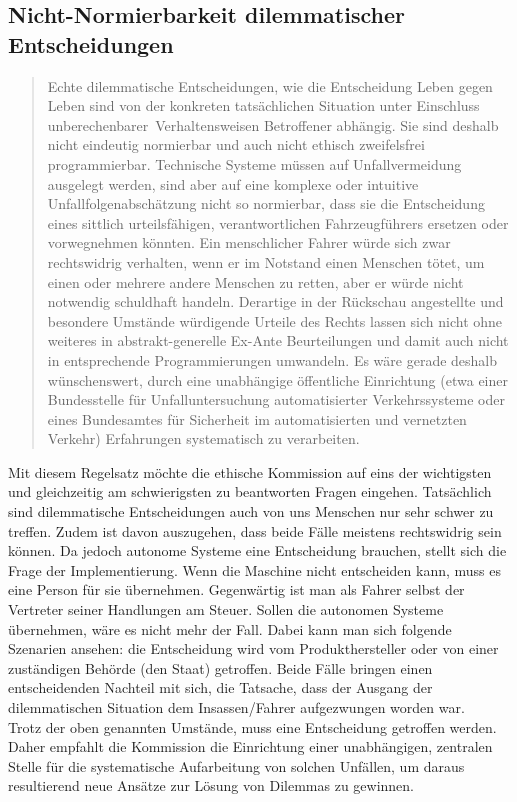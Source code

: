 \documentclass[twoside,a4paper,12pt]{article}
\begin{document}
\subsection{Nicht-Normierbarkeit dilemmatischer Entscheidungen} \label{NichtNormierbarkeitDilemmatischerEntscheidungen}
\begin{quote}
\glqq
Echte dilemmatische Entscheidungen, wie die Entscheidung Leben gegen Leben sind von
der konkreten tatsächlichen Situation unter Einschluss \glqq unberechenbarer\grqq\ Verhaltensweisen Betroffener abhängig. 
Sie sind deshalb nicht eindeutig normierbar und auch nicht
ethisch zweifelsfrei programmierbar. Technische Systeme müssen auf Unfallvermeidung
ausgelegt werden, sind aber auf eine komplexe oder intuitive Unfallfolgenabschätzung
nicht so normierbar, dass sie die Entscheidung eines sittlich urteilsfähigen, verantwortlichen Fahrzeugführers ersetzen 
oder vorwegnehmen könnten. Ein menschlicher Fahrer
würde sich zwar rechtswidrig verhalten, wenn er im Notstand einen Menschen tötet, um
einen oder mehrere andere Menschen zu retten, aber er würde nicht notwendig schuldhaft handeln. Derartige in der Rückschau 
angestellte und besondere Umstände würdigende Urteile des Rechts lassen sich nicht ohne weiteres in abstrakt-generelle 
Ex-Ante Beurteilungen und damit auch nicht in entsprechende Programmierungen umwandeln.
Es wäre gerade deshalb wünschenswert, durch eine unabhängige öffentliche Einrichtung
(etwa einer Bundesstelle für Unfalluntersuchung automatisierter Verkehrssysteme oder
eines Bundesamtes für Sicherheit im automatisierten und vernetzten Verkehr) Erfahrungen systematisch zu verarbeiten.\grqq\mbox{~\cite[S. 11]{ek}}
\end{quote}
Mit diesem Regelsatz möchte die ethische Kommission auf eins der wichtigsten und gleichzeitig am schwierigsten zu beantworten Fragen eingehen. Tatsächlich sind dilemmatische Entscheidungen auch von uns Menschen nur sehr schwer zu treffen. Zudem ist davon auszugehen, dass beide Fälle meistens rechtswidrig sein können.
Da jedoch autonome Systeme eine Entscheidung brauchen, stellt sich die Frage der Implementierung. Wenn die Maschine nicht entscheiden kann, muss es eine Person für sie übernehmen. Gegenwärtig ist man als Fahrer selbst der Vertreter seiner Handlungen am Steuer. Sollen die autonomen Systeme übernehmen, wäre es nicht mehr der Fall. Dabei kann man sich folgende Szenarien ansehen: die Entscheidung wird vom Produkthersteller oder von einer zuständigen Behörde (den Staat) getroffen. Beide Fälle bringen einen entscheidenden Nachteil mit sich, die Tatsache, dass der Ausgang der dilemmatischen Situation dem Insassen/Fahrer aufgezwungen worden war. \\
Trotz der oben genannten Umstände, muss eine Entscheidung getroffen werden. Daher empfahlt die Kommission die Einrichtung einer unabhängigen, zentralen Stelle für die systematische Aufarbeitung von solchen Unfällen, um daraus resultierend neue Ansätze zur Lösung von Dilemmas zu gewinnen.
\end{document}
